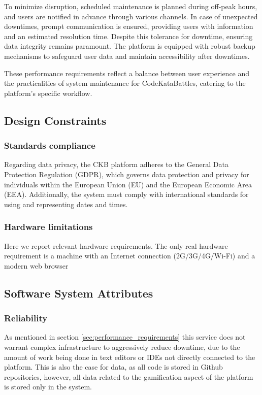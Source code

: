 To minimize disruption, scheduled maintenance is planned during off-peak hours, and users are notified in advance through various channels. In case of unexpected downtimes, prompt communication is ensured, providing users with information and an estimated resolution time. Despite this tolerance for downtime, ensuring data integrity remains paramount. The platform is equipped with robust backup mechanisms to safeguard user data and maintain accessibility after downtimes.

These performance requirements reflect a balance between user experience and the practicalities of system maintenance for CodeKataBattles, catering to the platform's specific workflow.




\subsection{Design Constraints}

\subsubsection{Standards compliance}
Regarding data privacy, the CKB platform adheres to the General Data Protection Regulation (GDPR), which governs data protection and privacy for individuals within the European Union (EU) and the European Economic Area (EEA). Additionally, the system must comply with international standards for using and representing dates and times.

\subsubsection{Hardware limitations}
Here we report relevant hardware requirements. The only real hardware requirement is a machine with an Internet connection (2G/3G/4G/Wi-Fi) and a modern web browser

\subsection{Software System Attributes}
\subsubsection{Reliability}
As mentioned in section \ref{sec:performance_requirements} this service does not warrant complex infrastructure to aggressively reduce downtime, due to the amount of work being done in text editors or IDEs not directly connected to the platform. This is also the case for data, as all code is stored in Github repositories, however, all data related to the gamification aspect of the platform is stored only in the system. 

